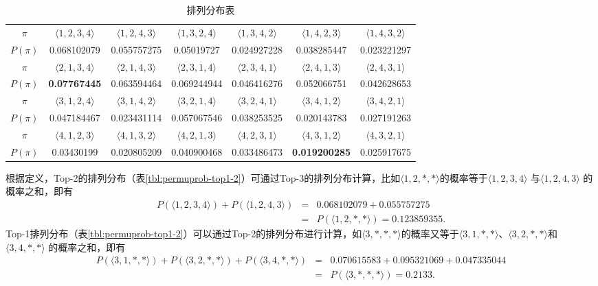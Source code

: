 \begin{example}
\begin{table}[htbp]
    \centering
    \begin{tabular}{|c|c|c|c|c|c|c|}
\hline
$\pi$ & $\langle 1,2,3,4\rangle$ & $\langle 1,2,4,3\rangle$ & $\langle 1,3,2,4\rangle$ & $\langle 1,3,4,2\rangle$ & $\langle 1,4,2,3\rangle$ & $\langle 1,4,3,2\rangle$\\
$P(\pi)$ & 0.068102079 & 0.055757275 & 0.05019727 & 0.024927228 & 0.038285447 & 0.023221297\\
\hline
$\pi$ & $\langle2,1,3,4\rangle$ & $\langle2,1,4,3\rangle$ & $\langle2,3,1,4\rangle$ & $\langle2,3,4,1\rangle$ & $\langle2,4,1,3\rangle$ & $\langle2,4,3,1\rangle$\\
$P(\pi)$ & \bf{0.07767445} & 0.063594464 & 0.069244944 & 0.046416276 & 0.052066751 & 0.042628653\\
\hline
$\pi$ & $\langle3,1,2,4\rangle$ & $\langle3,1,4,2\rangle$ & $\langle3,2,1,4\rangle$ & $\langle3,2,4,1\rangle$ & $\langle3,4,1,2\rangle$ & $\langle3,4,2,1\rangle$\\
$P(\pi)$ & 0.047184467 & 0.023431114 & 0.057067546 & 0.038253525 & 0.020143783 & 0.027191263\\
\hline
$\pi$ & $\langle4,1,2,3\rangle$ & $\langle4,1,3,2\rangle$ & $\langle4,2,1,3\rangle$ & $\langle4,2,3,1\rangle$ & $\langle4,3,1,2\rangle$ & $\langle4,3,2,1\rangle$\\
$P(\pi)$ & 0.03430199 & 0.020805209 & 0.040900468 & 0.033486473 & \bf{0.019200285} & 0.025917675\\
      \hline
    \end{tabular}
    \caption{排列分布表}
    \label{tbl:permuprob}
\end{table}

根据定义，Top-2的排列分布（表\ref{tbl:permuprob-top1-2}）可通过Top-3的排列分布计算，比如$\langle 1,2,*,*\rangle$的概率等于$\langle 1,2,3,4\rangle$ 与$\langle 1,2,4,3\rangle$ 的概率之和，即有
\[
\begin{array}{lcl}
    P(\langle 1,2,3,4\rangle) + P(\langle 1,2,4,3\rangle) & = &  0.068102079 + 0.055757275\\
    & = & P(\langle 1,2,*,*\rangle) = 0.123859355.
\end{array}
\]
Top-1排列分布（表\ref{tbl:permuprob-top1-2}）可以通过Top-2的排列分布进行计算，如$\langle 3,*,*,*\rangle$的概率又等于$\langle 3,1,*,*\rangle$、$\langle 3,2,*,*\rangle$和$\langle 3,4,*,*\rangle$ 的概率之和，即有
\[
\begin{array}{lcl}
    P(\langle 3,1,*,*\rangle) + P(\langle 3,2,*,*\rangle) + P(\langle 3,4,*,*\rangle)& = & 0.070615583 + 0.095321069 + 0.047335044 \\
    & = & P(\langle 3,*,*,*\rangle) = 0.2133.
\end{array}
\]


\end{example}
